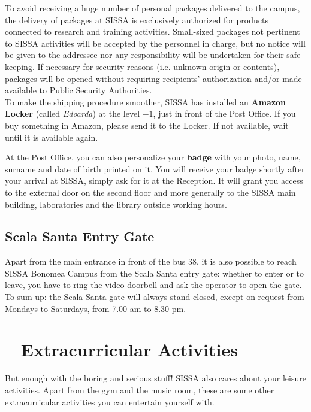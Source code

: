 \documentclass{sissavademecum}
\begin{document}
To avoid receiving a huge number of personal packages delivered to the campus, the delivery of packages at SISSA is exclusively authorized for products connected to research and training activities. Small-sized packages not pertinent to SISSA activities will be accepted by the personnel in charge, but no notice will be given to the addressee nor any responsibility will be undertaken for their safe-keeping. If necessary for security reasons (i.e. unknown origin or contents), packages will be opened without requiring recipients' authorization and/or made available to Public Security Authorities.\\
To make the shipping procedure smoother, SISSA has installed an \textbf{Amazon Locker} (called \emph{Edoarda}) at the level $-1$, just in front of the Post Office. If you buy something in Amazon, please send it to the Locker. If not available, wait until it is available again. 


At the Post Office, you can also personalize your \hypertarget{Badge}{}\textbf{badge} with your photo, name, surname and date of birth printed on it. You will receive your badge shortly after your arrival at SISSA, simply ask for it at the Reception. It will grant you access to the external door on the second floor and more generally to the SISSA main building, laboratories and the library outside working hours.


\section{Scala Santa Entry Gate}

Apart from the main entrance in front of the bus 38, it is also possible to reach SISSA Bonomea Campus from the Scala Santa entry gate: whether to enter or to leave, you have to ring the video doorbell and ask the operator to open the gate. To sum up: the Scala Santa gate will always stand closed, except on request from Mondays to Saturdays, from 7.00 am to 8.30 pm.




\chapter{\texorpdfstring{\faFutbol\ }{} Extracurricular Activities}

But enough with the boring and serious stuff! SISSA also cares about your leisure activities. Apart from the gym and the music room, these are some other extracurricular activities you can entertain yourself with.
\end{document}
